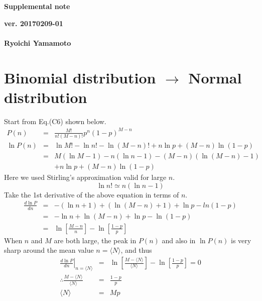 \documentclass[a4paper,11pt]{article}
\begin{document}
\begin{center}
  {\LARGE\bf Supplemental note}
  \end{center}
\begin{flushright}
  {\large\bf ver. 20170209-01}\\
 \ \\
{\large\bf Ryoichi Yamamoto}\\
\end{flushright}
\section{Binomial distribution $\rightarrow$ Normal distribution}

Start from Eq.(C6) shown below.
\begin{eqnarray}
  P(n)&=&\frac{M!}{n!(M-n)!}p^n(1-p)^{M-n}\\
  \ln P(n)&=&\ln M! -\ln n! - \ln (M-n)!+n\ln p +(M-n)\ln(1-p)\\
  &=&M(\ln M -1) -n(\ln n -1) - (M-n)(\ln (M-n)-1)\\& & + n\ln p +(M-n)\ln (1-p)
\end{eqnarray}
Here we used Stirling's approximation  valid for large $n$.
\begin{equation}
\ln n!\simeq n(\ln n -1)
\end{equation}
Take the 1st derivative of the above equation in terms of $n$.
\begin{eqnarray}
  \frac{d \ln P}{dn}&=&-(\ln n +1) + (\ln(M-n)+1) + \ln p -ln(1-p)\\
  &=&-\ln n + \ln(M-n)+\ln p -\ln(1-p)\\
  &=&\ln \left[\frac{M-n}{n} \right] - \ln \left[\frac{1-p}{p} \right] 
\end{eqnarray}
When $n$ and $M$ are both large, the peak in $P(n)$ and also in $\ln P(n)$ is very sharp around the mean value $n=\langle N\rangle$, and thus
\begin{eqnarray}
  \left.\frac{d \ln P}{dn}\right|_{n=\langle N\rangle} &=&\ln \left[\frac{M-\langle N\rangle}{\langle N\rangle} \right] - \ln \left[\frac{1-p}{p} \right] =0\\
  \therefore \frac{M-\langle N\rangle}{\langle N\rangle} &=& \frac{1-p}{p} \\
  \langle N\rangle&=&Mp
\end{eqnarray}
\end{document}
